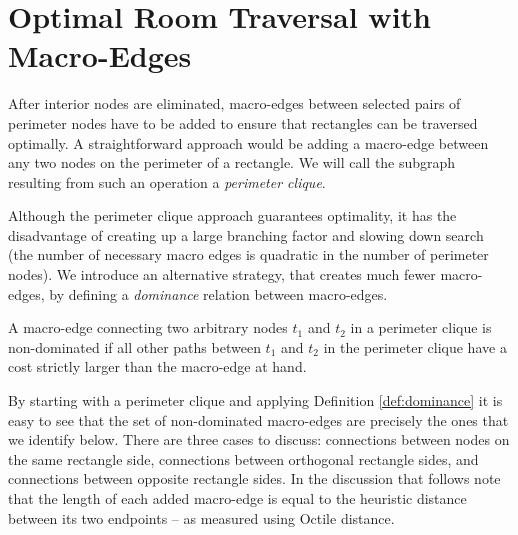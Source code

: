 \section{Optimal Room Traversal with Macro-Edges}

After interior nodes are eliminated, macro-edges between selected pairs of
perimeter nodes have to be added to ensure that rectangles can be traversed
optimally.  A straightforward approach would be adding a macro-edge between any
two nodes on the perimeter of a rectangle.  We will call the subgraph resulting
from such an operation a \emph{perimeter clique}.

Although the perimeter clique approach guarantees optimality, it has the
disadvantage of creating up a large branching factor and slowing down search
(the number of necessary macro edges is quadratic in the number of 
perimeter nodes).  We
introduce an alternative strategy, that creates much fewer macro-edges, by
defining a \emph{dominance} relation between macro-edges.
%

\begin{definition}
\label{def:dominance}
A macro-edge connecting two arbitrary nodes $t_1$ and $t_2$ in a perimeter
clique is non-dominated if all other paths between $t_1$ and $t_2$ in the
perimeter clique have a cost strictly larger than the macro-edge at hand.
\end{definition}

By starting with a perimeter clique and applying Definition \ref{def:dominance}
it is easy to see that the set of non-dominated macro-edges are precisely the
ones that we identify below.  There are three cases to discuss: connections
between nodes on the same rectangle side, connections between orthogonal
rectangle sides, and connections between opposite rectangle sides.
In the discussion that follows note that the length of each added macro-edge 
is equal to the heuristic distance between its two endpoints -- as measured
using Octile distance.

